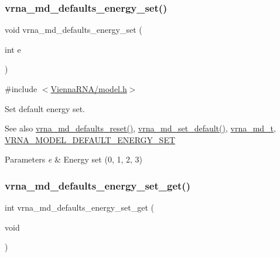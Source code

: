 \subsubsection{\texorpdfstring{vrna\_md\_defaults\_energy\_set()}{vrna\_md\_defaults\_energy\_set()}}
{\footnotesize\ttfamily void vrna\+\_\+md\+\_\+defaults\+\_\+energy\+\_\+set (\begin{DoxyParamCaption}\item[{int}]{e }\end{DoxyParamCaption})}



{\ttfamily \#include $<$\mbox{\hyperlink{model_8h}{Vienna\+R\+N\+A/model.\+h}}$>$}



Set default energy set. 

\begin{DoxySeeAlso}{See also}
\mbox{\hyperlink{group__model__details_ga70834424cf804d149937de89f80ceb45}{vrna\+\_\+md\+\_\+defaults\+\_\+reset()}}, \mbox{\hyperlink{group__model__details_ga8ac6ff84936282436f822644bf841f66}{vrna\+\_\+md\+\_\+set\+\_\+default()}}, \mbox{\hyperlink{group__model__details_ga1f8a10e12a0a1915f2a4eff0b28ea17c}{vrna\+\_\+md\+\_\+t}}, \mbox{\hyperlink{group__model__details_ga6fcf6b2d0f89256cdbd166486c9b6e1e}{V\+R\+N\+A\+\_\+\+M\+O\+D\+E\+L\+\_\+\+D\+E\+F\+A\+U\+L\+T\+\_\+\+E\+N\+E\+R\+G\+Y\+\_\+\+S\+ET}} 
\end{DoxySeeAlso}

\begin{DoxyParams}{Parameters}
{\em e} & Energy set (0, 1, 2, 3) \\
\hline
\end{DoxyParams}
\mbox{\label{group__model__details_ga017ed6afb1cba2b7f242412cab618b53}} 
\subsubsection{\texorpdfstring{vrna\_md\_defaults\_energy\_set\_get()}{vrna\_md\_defaults\_energy\_set\_get()}}
{\footnotesize\ttfamily int vrna\+\_\+md\+\_\+defaults\+\_\+energy\+\_\+set\+\_\+get (\begin{DoxyParamCaption}\item[{void}]{ }\end{DoxyParamCaption})}



